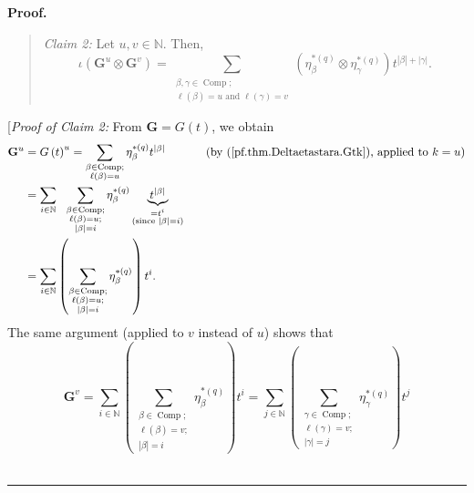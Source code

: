 \documentclass[numbers=enddot,12pt,final,onecolumn,notitlepage]{scrartcl}%
\theoremstyle{definition}
\newenvironment{statement}{\begin{quote}}{\end{quote}}
\newenvironment{proof}[1][Proof]{\noindent\textbf{#1.} }{\ \rule{0.5em}{0.5em}}
\let\sumnonlimits\sum
\renewcommand{\sum}{\sumnonlimits\limits}
\begin{document}
\begin{proof}
\begin{statement}
\textit{Claim 2:} Let $u,v\in\mathbb{N}$. Then,%
\[
\iota\left(  \mathbf{G}^{u}\otimes\mathbf{G}^{v}\right)  =\sum
_{\substack{\beta,\gamma\in\operatorname*{Comp};\\\ell\left(  \beta\right)
=u\text{ and }\ell\left(  \gamma\right)  =v}}\left(  \eta_{\beta}^{\ast\left(
q\right)  }\otimes\eta_{\gamma}^{\ast\left(  q\right)  }\right)  t^{\left\vert
\beta\right\vert +\left\vert \gamma\right\vert }.
\]

\end{statement}

[\textit{Proof of Claim 2:} From $\mathbf{G}=G\left(  t\right)  $, we obtain%
\begin{align}
\mathbf{G}^{u}  &  =G\left(  t\right)  ^{u}=\sum_{\substack{\beta
\in\operatorname*{Comp};\\\ell\left(  \beta\right)  =u}}\eta_{\beta}%
^{\ast\left(  q\right)  }t^{\left\vert \beta\right\vert }%
\ \ \ \ \ \ \ \ \ \ \left(  \text{by (\ref{pf.thm.Deltaetastara.Gtk}), applied
to }k=u\right) \nonumber\\
&  =\sum_{i\in\mathbb{N}}\ \ \sum_{\substack{\beta\in\operatorname*{Comp}%
;\\\ell\left(  \beta\right)  =u;\\\left\vert \beta\right\vert =i}}\eta_{\beta
}^{\ast\left(  q\right)  }\underbrace{t^{\left\vert \beta\right\vert }%
}_{\substack{=t^{i}\\\text{(since }\left\vert \beta\right\vert =i\text{)}%
}}\nonumber\\
&  =\sum_{i\in\mathbb{N}}\left(  \sum_{\substack{\beta\in\operatorname*{Comp}%
;\\\ell\left(  \beta\right)  =u;\\\left\vert \beta\right\vert =i}}\eta_{\beta
}^{\ast\left(  q\right)  }\right)  t^{i}.
\label{pf.thm.Deltaetastara.g1g2o.c2.pf.beta}%
\end{align}
The same argument (applied to $v$ instead of $u$) shows that%
\[
\mathbf{G}^{v}=\sum_{i\in\mathbb{N}}\left(  \sum_{\substack{\beta
\in\operatorname*{Comp};\\\ell\left(  \beta\right)  =v;\\\left\vert
\beta\right\vert =i}}\eta_{\beta}^{\ast\left(  q\right)  }\right)  t^{i}%
=\sum_{j\in\mathbb{N}}\left(  \sum_{\substack{\gamma\in\operatorname*{Comp}%
;\\\ell\left(  \gamma\right)  =v;\\\left\vert \gamma\right\vert =j}%
}\eta_{\gamma}^{\ast\left(  q\right)  }\right)  t^{j}%
\]
\end{proof}
\end{document}
